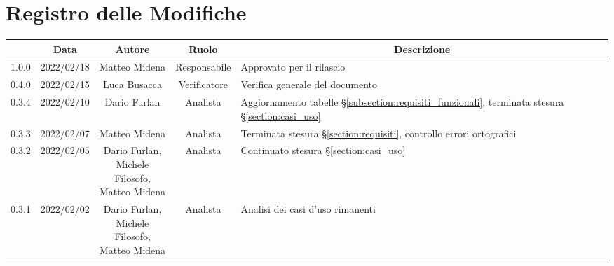 \thispagestyle{empty}
\section*{Registro delle Modifiche}

\begin{center}
	\renewcommand{\arraystretch}{1.8}
	\begin{longtable}[c]{c | c | c | c | p{5cm}}
		\rowcolor[HTML]{125E28}
		\multicolumn{1}{c}{\color[HTML]{FFFFFF} \textbf{Versione}} &
		\multicolumn{1}{c}{\color[HTML]{FFFFFF} \textbf{Data}}     &
		\multicolumn{1}{c}{\color[HTML]{FFFFFF} \textbf{Autore}}   &
		\multicolumn{1}{c}{\color[HTML]{FFFFFF} \textbf{Ruolo}}    &
		\multicolumn{1}{c}{\color[HTML]{FFFFFF} \textbf{Descrizione}}                                                                                                                                                                \\
		\endhead
		1.0.0                                                      & 2022/02/18 & Matteo Midena             & Responsabile & Approvato per il rilascio                                                                               \\
		0.4.0                                                      & 2022/02/15 & Luca Busacca              & Verificatore & Verifica generale del documento                                                                         \\
		0.3.4                                                      & 2022/02/10 & Dario Furlan              & Analista     & Aggiornamento tabelle §\ref{subsection:requisiti_funzionali}, terminata stesura §\ref{section:casi_uso} \\
		0.3.3                                                      & 2022/02/07 & Matteo Midena             & Analista     & Terminata stesura §\ref{section:requisiti}, controllo errori ortografici                                \\
		0.3.2                                                      & 2022/02/05 & \shortstack{Dario Furlan,                                                                                                                          \\ Michele Filosofo,\\ Matteo Midena} & Analista & Continuato stesura §\ref{section:casi_uso} \\
		0.3.1                                                      & 2022/02/02 & \shortstack{Dario Furlan,                                                                                                                          \\ Michele Filosofo,\\ Matteo Midena} & Analista & Analisi dei casi d'uso rimanenti \\

\end{longtable}
\end{center}
